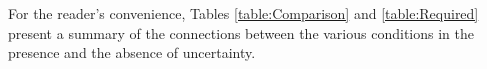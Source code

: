 \documentclass[BufferStockTheory]{subfiles}
\begin{document}
For the reader's convenience, Tables \ref{table:Comparison} and \ref{table:Required}
present a summary of the connections between the various conditions in the presence
and the absence of uncertainty.

\hypertarget{Factors-Defined-And-Compared}{}


\hypertarget{Sufficient-Conditions}{}
\hypertarget{Sufficient-Conditions-For-Nondegenerate-Solution}{}

\end{document}
